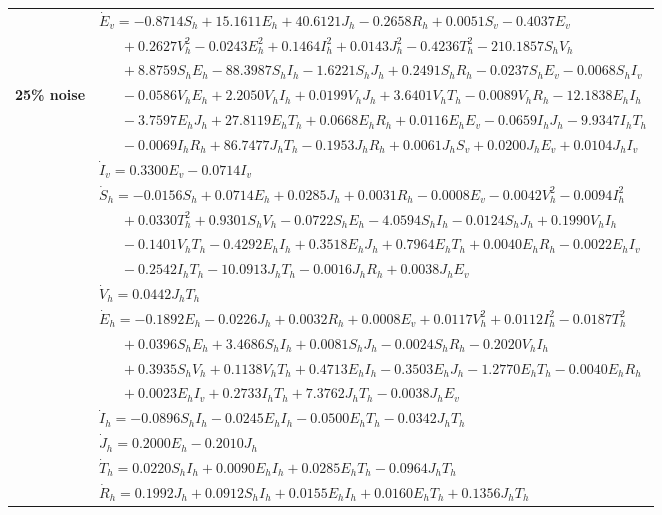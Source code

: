 \documentclass[9pt]{article}
\numberwithin{equation}{section}
\begin{document}
\begin{table}[ht]
    \begin{tabularx}{1\linewidth}{|l|X|} 
        & $\dot{E}_v=-0.8714S_h+15.1611E_h+40.6121J_h-0.2658R_h+0.0051S_v-0.4037E_v$ \\
        & $\quad\;\;+0.2627V_h^2-0.0243E_h^2+0.1464I_h^2+0.0143J_h^2-0.4236T_h^2-210.1857S_hV_h$ \\
        & $\quad\;\;+8.8759S_hE_h-88.3987S_hI_h-1.6221S_hJ_h+0.2491S_hR_h-0.0237S_hE_v-0.0068S_hI_v$ \\
        \textbf{25\% noise} & $\quad\;\;-0.0586V_hE_h+2.2050V_hI_h+0.0199V_hJ_h+3.6401V_hT_h-0.0089V_hR_h-12.1838E_hI_h$ \\
        & $\quad\;\;-3.7597E_hJ_h+27.8119E_hT_h+0.0668E_hR_h+0.0116E_hE_v-0.0659I_hJ_h-9.9347I_hT_h$ \\
        & $\quad\;\;-0.0069I_hR_h+86.7477J_hT_h-0.1953J_hR_h+0.0061J_hS_v+0.0200J_hE_v+0.0104J_hI_v$ \\
        & $\dot{I}_v=0.3300E_v-0.0714I_v$ \\
        \hline\hline
        & $\dot{S}_h=-0.0156S_h+0.0714E_h+0.0285J_h+0.0031R_h-0.0008E_v-0.0042V_h^2-0.0094I_h^2$ \\
        & $\quad\;\;+0.0330T_h^2+0.9301S_hV_h-0.0722S_hE_h-4.0594S_hI_h-0.0124S_hJ_h+0.1990V_hI_h$ \\
        & $\quad\;\;-0.1401V_hT_h-0.4292E_hI_h+0.3518E_hJ_h+0.7964E_hT_h+0.0040E_hR_h-0.0022E_hI_v$ \\
        & $\quad\;\;-0.2542I_hT_h-10.0913J_hT_h-0.0016J_hR_h+0.0038J_hE_v$ \\
        & $\dot{V}_h=0.0442J_hT_h$ \\
        & $\dot{E}_h=-0.1892E_h-0.0226J_h+0.0032R_h+0.0008E_v+0.0117V_h^2+0.0112I_h^2-0.0187T_h^2$ \\
        & $\quad\;\;+0.0396S_hE_h+3.4686S_hI_h+0.0081S_hJ_h-0.0024S_hR_h-0.2020V_hI_h$ \\
        & $\quad\;\;+0.3935S_hV_h+0.1138V_hT_h+0.4713E_hI_h-0.3503E_hJ_h-1.2770E_hT_h-0.0040E_hR_h$ \\
        & $\quad\;\;+0.0023E_hI_v+0.2733I_hT_h+7.3762J_hT_h-0.0038J_hE_v$ \\
        & $\dot{I}_h=-0.0896S_hI_h-0.0245E_hI_h-0.0500E_hT_h-0.0342J_hT_h$ \\
        & $\dot{J}_h=0.2000E_h-0.2010J_h$ \\
        & $\dot{T}_h=0.0220S_hI_h+0.0090E_hI_h+0.0285E_hT_h-0.0964J_hT_h$ \\
        & $\dot{R}_h=0.1992J_h+0.0912S_hI_h+0.0155E_hI_h+0.0160E_hT_h+0.1356J_hT_h$ \\

\end{tabularx}
\end{table}
\end{document}
